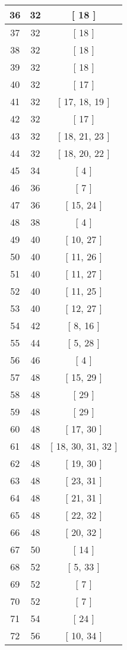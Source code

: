 \begin{center}
\begin{longtable}[H]{|| c c c ||}
36 & 32 & [ 18 ] \\ 
\hline
37 & 32 & [ 18 ] \\ 
\hline
38 & 32 & [ 18 ] \\ 
\hline
39 & 32 & [ 18 ] \\ 
\hline
40 & 32 & [ 17 ] \\ 
\hline
41 & 32 & [ 17, 18, 19 ] \\ 
\hline
42 & 32 & [ 17 ] \\ 
\hline
43 & 32 & [ 18, 21, 23 ] \\ 
\hline
44 & 32 & [ 18, 20, 22 ] \\ 
\hline
45 & 34 & [ 4 ] \\ 
\hline
46 & 36 & [ 7 ] \\ 
\hline
47 & 36 & [ 15, 24 ] \\ 
\hline
48 & 38 & [ 4 ] \\ 
\hline
49 & 40 & [ 10, 27 ] \\ 
\hline
50 & 40 & [ 11, 26 ] \\ 
\hline
51 & 40 & [ 11, 27 ] \\ 
\hline
52 & 40 & [ 11, 25 ] \\ 
\hline
53 & 40 & [ 12, 27 ] \\ 
\hline
54 & 42 & [ 8, 16 ] \\ 
\hline
55 & 44 & [ 5, 28 ] \\ 
\hline
56 & 46 & [ 4 ] \\ 
\hline
57 & 48 & [ 15, 29 ] \\ 
\hline
58 & 48 & [ 29 ] \\ 
\hline
59 & 48 & [ 29 ] \\ 
\hline
60 & 48 & [ 17, 30 ] \\ 
\hline
61 & 48 & [ 18, 30, 31, 32 ] \\ 
\hline
62 & 48 & [ 19, 30 ] \\ 
\hline
63 & 48 & [ 23, 31 ] \\ 
\hline
64 & 48 & [ 21, 31 ] \\ 
\hline
65 & 48 & [ 22, 32 ] \\ 
\hline
66 & 48 & [ 20, 32 ] \\ 
\hline
67 & 50 & [ 14 ] \\ 
\hline
68 & 52 & [ 5, 33 ] \\ 
\hline
69 & 52 & [ 7 ] \\ 
\hline
70 & 52 & [ 7 ] \\ 
\hline
71 & 54 & [ 24 ] \\ 
\hline
72 & 56 & [ 10, 34 ] \\ 

\end{longtable}
\end{center}
